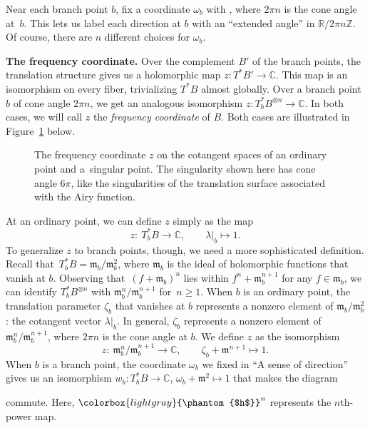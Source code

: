 \documentclass[pdftex]{sigma}
\newcommand{\maps}{\colon}
\newcommand{\Z}{\mathbb{Z}}
\newcommand{\R}{\mathbb{R}}
\newcommand{\C}{\mathbb{C}}
\newcommand{\blankbox}{{\fboxsep 0pt \colorbox{lightgray}{\phantom{$h$}}}}
\newcommand{\van}{\mathfrak{m}}
\numberwithin{equation}{section}
\begin{document}
Near each branch point $b$, fix a coordinate $\omega_b$ with , where $2\pi n$ is the cone angle at~$b$. This lets us label each direction at $b$ with an ``extended angle'' in $\R/2\pi n\Z$. Of course, there are $n$ different choices for $\omega_b$.

{\bf The frequency coordinate.}\label{transl-freq}
%
Over the complement $B'$ of the branch points, the translation structure gives us a holomorphic map $z \maps T^*B' \to \C$. This map is an isomorphism on every fiber, trivializing $T^*B$ almost globally. Over a branch point $b$ of cone angle $2\pi n$, we get an analogous isomorphism $z \maps T^*_bB^{\otimes n} \to \C$. In both cases, we will call $z$ the {\em frequency coordinate} of $B$. Both cases are illustrated in Figure~\ref{fig:geometric-picture} below.
\begin{figure}[!ht]\centering
\phaseSpaceLaplace
\caption{The frequency coordinate $z$ on the cotangent spaces of an ordinary point and a~singular point. The singularity shown here has cone angle $6\pi$, like the singularities of the translation surface associated with the Airy function.}\label{fig:geometric-picture}
\end{figure}

\noindent
At an ordinary point, we can define $z$ simply as the map
\begin{equation*}
z \maps\ T^*_bB \to \C ,\qquad
\lambda\big|_b \mapsto 1.
\end{equation*}
To generalize $z$ to branch points, though, we need a more sophisticated definition. Recall that~${T^*_bB = \van_b / \van_b^2}$, where $\van_b$ is the ideal of holomorphic functions that vanish at $b$. Observing that~${(f + \van_b)^n}$ lies within $f^n + \van_b^{n+1}$ for any $f \in \van_b$, we can identify $T^*_bB^{\otimes n}$ with $\van_b^n / \van_b^{n+1}$ for~${n \ge 1}$. When $b$ is an ordinary point, the translation parameter $\zeta_b$ that vanishes at $b$ represents a nonzero element of $\van_b / \van_b^2$: the cotangent vector $\lambda|_b$. In general, $\zeta_b$ represents a nonzero element of $\van_b^n / \van_b^{n+1}$, where $2\pi n$ is the cone angle at $b$. We define $z$ as the isomorphism
\begin{equation*}
z \maps\ \van_b^n / \van_b^{n+1} \to \C,\qquad
\zeta_b + \van^{n+1} \mapsto 1.
\end{equation*}
When $b$ is a branch point, the coordinate $\omega_b$ we fixed in ``A sense of direction'' gives us an isomorphism
$
w_b \maps T^*_bB \to \C $, $
\omega_b + \van^2 \mapsto 1$
that makes the diagram
\begin{center}
\end{center}
commute. Here, $\blankbox^n$ represents the $n$th-power map.
%
\end{document}
